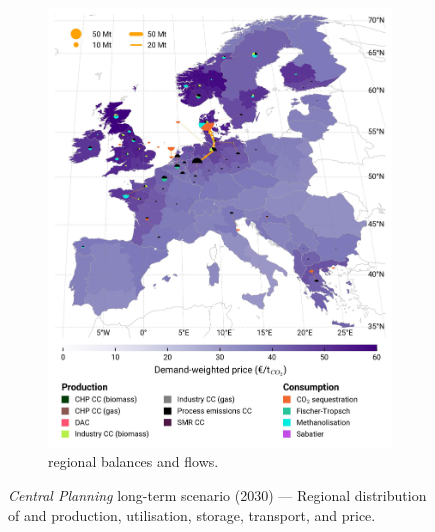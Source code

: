 \documentclass[final,5p,times,twocolumn,sort&compress]{elsarticle}
\begin{document}
\begin{figure}[htbp]
\begin{subfigure}[t]{0.49\textwidth}
      \includegraphics[width=1\textwidth]{maps/greenfield-pipelines/base_s_adm___2030-balance_map_co2_stored} 
      \vspace{-0.7cm}
      \caption{ regional balances and flows.}
      \label{fig:CP_lt_2030_co2}
  \end{subfigure}
  \caption{\textit{Central Planning} long-term scenario (2030) --- Regional distribution of  and  production, utilisation, storage, transport, and price.}
  \label{fig:CP_lt_2030}
\end{figure}
\end{document}
